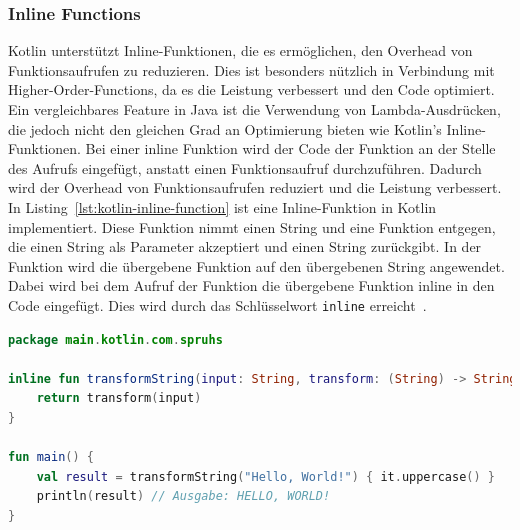 \documentclass[11pt]{article}
\begin{document}
    \subsubsection{Inline Functions}
    Kotlin unterstützt Inline-Funktionen, die es ermöglichen, den Overhead von Funktionsaufrufen zu reduzieren.
    Dies ist besonders nützlich in Verbindung mit Higher-Order-Functions, da es die Leistung verbessert und den Code optimiert.
    Ein vergleichbares Feature in Java ist die Verwendung von Lambda-Ausdrücken, die jedoch nicht den gleichen Grad an Optimierung bieten wie Kotlin's Inline-Funktionen.
    Bei einer inline Funktion wird der Code der Funktion an der Stelle des Aufrufs eingefügt, anstatt einen Funktionsaufruf durchzuführen.
    Dadurch wird der Overhead von Funktionsaufrufen reduziert und die Leistung verbessert.
    In Listing~\ref{lst:kotlin-inline-function} ist eine Inline-Funktion in Kotlin implementiert.
    Diese Funktion nimmt einen String und eine Funktion entgegen, die einen String als Parameter akzeptiert und einen String zurückgibt.
    In der Funktion wird die übergebene Funktion auf den übergebenen String angewendet.
    Dabei wird bei dem Aufruf der Funktion die übergebene Funktion inline in den Code eingefügt.
    Dies wird durch das Schlüsselwort \texttt{inline} erreicht~\cite{kotlin-inline}.

    \begin{lstlisting}[language=Kotlin, caption={HigherOrderJava.java}, label={kotlin-inline-function}]
package main.kotlin.com.spruhs

inline fun transformString(input: String, transform: (String) -> String): String {
    return transform(input)
}

fun main() {
    val result = transformString("Hello, World!") { it.uppercase() }
    println(result) // Ausgabe: HELLO, WORLD!
}
    \end{lstlisting}
\end{document}
